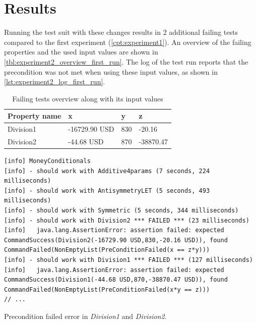 \section{Results}
Running the test suit with these changes results in 2 additional failing tests compared to the first experiment (\autoref{cpt:experiment1}). An overview of the failing properties and the used input values are shown in \autoref{tbl:experiment2_overview_first_run}. The log of the test run reports that the precondition was not met when using these input values, as shown in \autoref{lst:experiment2_log_first_run}.
\FloatBarrier
\begin{table}[!ht]
\centering
\begin{tabular}{llll}
\hline
\textbf{Property name} & \textbf{x}    & \textbf{y} & \textbf{z} \\ \hline
Division1              & -16729.90 USD & 830        & -20.16     \\
Division2              & -44.68 USD    & 870        & -38870.47  \\ \hline
\end{tabular}
\caption{Failing tests overview along with its input values}
\label{tbl:experiment2_overview_first_run}
\end{table}
\FloatBarrier

\FloatBarrier
\begin{sourcecode}[!ht]
\begin{lstlisting}[language=Log]
[info] MoneyConditionals
[info] - should work with Additive4params (7 seconds, 224 milliseconds)
[info] - should work with AntisymmetryLET (5 seconds, 493 milliseconds)
[info] - should work with Symmetric (5 seconds, 344 milliseconds)
[info] - should work with Division2 *** FAILED *** (23 milliseconds)
[info]   java.lang.AssertionError: assertion failed: expected CommandSuccess(Division2(-16729.90 USD,830,-20.16 USD)), found CommandFailed(NonEmptyList(PreConditionFailed(x == z*y)))
[info] - should work with Division1 *** FAILED *** (127 milliseconds)
[info]   java.lang.AssertionError: assertion failed: expected CommandSuccess(Division1(-44.68 USD,870,-38870.47 USD)), found CommandFailed(NonEmptyList(PreConditionFailed(x*y == z)))
// ...
\end{lstlisting}
\caption{Precondition failed error in \textit{Division1} and \textit{Division2}.}
\label{lst:experiment2_log_first_run}
\end{sourcecode}
\FloatBarrier

